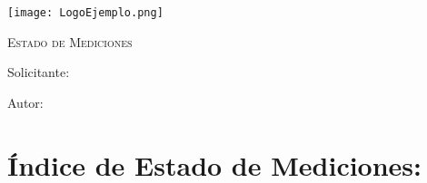 \documentclass[main]{subfiles}
\begin{document}
\newpage
\thispagestyle{empty}
\begin{center}
    \centering
    \texttt{[image: LogoEjemplo.png]} \par
    \vspace{3 cm}
    {\scshape\Huge Estado de Mediciones \par}
    \vspace{1.5cm}
    {\itshape\Huge \TituloProyecto \par}
    \vfill
    {\Large Solicitante:  \Solicitante \par}
    \vspace{0.5cm}
    {\Large Autor:  \Autor \par}
    \vspace{1.5cm}
    {\Large \Fecha \par}
\end{center}


\chapter*{Índice de Estado de Mediciones:}
\newpage
{}


\end{document}
